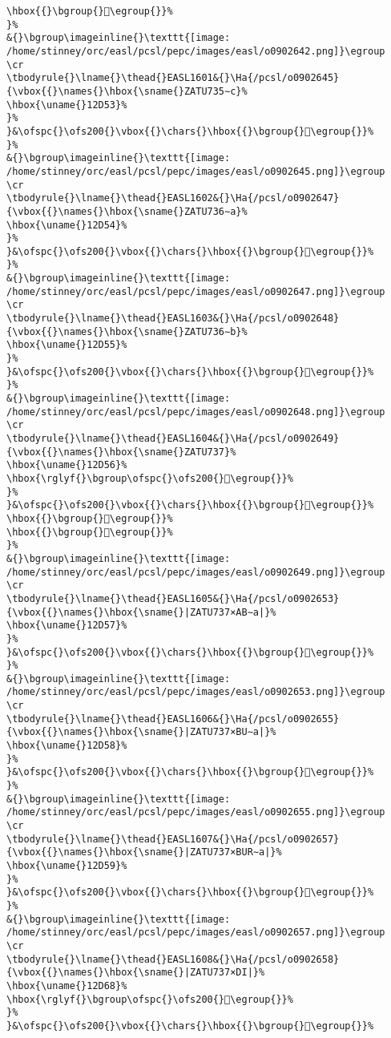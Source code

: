 \begin{verbatim}
\hbox{{}\bgroup{}𒵑\egroup{}}%
}%
&{}\bgroup\imageinline{}\texttt{[image: /home/stinney/orc/easl/pcsl/pepc/images/easl/o0902642.png]}\egroup
\cr
\tbodyrule{}\lname{}\thead{}EASL1601&{}\Ha{/pcsl/o0902645}{\vbox{{}\names{}\hbox{\sname{}ZATU735∼c}%
\hbox{\uname{}12D53}%
}%
}&\ofspc{}\ofs200{}\vbox{{}\chars{}\hbox{{}\bgroup{}𒵓\egroup{}}%
}%
&{}\bgroup\imageinline{}\texttt{[image: /home/stinney/orc/easl/pcsl/pepc/images/easl/o0902645.png]}\egroup
\cr
\tbodyrule{}\lname{}\thead{}EASL1602&{}\Ha{/pcsl/o0902647}{\vbox{{}\names{}\hbox{\sname{}ZATU736∼a}%
\hbox{\uname{}12D54}%
}%
}&\ofspc{}\ofs200{}\vbox{{}\chars{}\hbox{{}\bgroup{}𒵔\egroup{}}%
}%
&{}\bgroup\imageinline{}\texttt{[image: /home/stinney/orc/easl/pcsl/pepc/images/easl/o0902647.png]}\egroup
\cr
\tbodyrule{}\lname{}\thead{}EASL1603&{}\Ha{/pcsl/o0902648}{\vbox{{}\names{}\hbox{\sname{}ZATU736∼b}%
\hbox{\uname{}12D55}%
}%
}&\ofspc{}\ofs200{}\vbox{{}\chars{}\hbox{{}\bgroup{}𒵕\egroup{}}%
}%
&{}\bgroup\imageinline{}\texttt{[image: /home/stinney/orc/easl/pcsl/pepc/images/easl/o0902648.png]}\egroup
\cr
\tbodyrule{}\lname{}\thead{}EASL1604&{}\Ha{/pcsl/o0902649}{\vbox{{}\names{}\hbox{\sname{}ZATU737}%
\hbox{\uname{}12D56}%
\hbox{\rglyf{}\bgroup\ofspc{}\ofs200{}𒵖\egroup{}}%
}%
}&\ofspc{}\ofs200{}\vbox{{}\chars{}\hbox{{}\bgroup{}𒵖\egroup{}}%
\hbox{{}\bgroup{}𒵤\egroup{}}%
\hbox{{}\bgroup{}𒵧\egroup{}}%
}%
&{}\bgroup\imageinline{}\texttt{[image: /home/stinney/orc/easl/pcsl/pepc/images/easl/o0902649.png]}\egroup
\cr
\tbodyrule{}\lname{}\thead{}EASL1605&{}\Ha{/pcsl/o0902653}{\vbox{{}\names{}\hbox{\sname{}|ZATU737×AB∼a|}%
\hbox{\uname{}12D57}%
}%
}&\ofspc{}\ofs200{}\vbox{{}\chars{}\hbox{{}\bgroup{}𒵗\egroup{}}%
}%
&{}\bgroup\imageinline{}\texttt{[image: /home/stinney/orc/easl/pcsl/pepc/images/easl/o0902653.png]}\egroup
\cr
\tbodyrule{}\lname{}\thead{}EASL1606&{}\Ha{/pcsl/o0902655}{\vbox{{}\names{}\hbox{\sname{}|ZATU737×BU∼a|}%
\hbox{\uname{}12D58}%
}%
}&\ofspc{}\ofs200{}\vbox{{}\chars{}\hbox{{}\bgroup{}𒵘\egroup{}}%
}%
&{}\bgroup\imageinline{}\texttt{[image: /home/stinney/orc/easl/pcsl/pepc/images/easl/o0902655.png]}\egroup
\cr
\tbodyrule{}\lname{}\thead{}EASL1607&{}\Ha{/pcsl/o0902657}{\vbox{{}\names{}\hbox{\sname{}|ZATU737×BUR∼a|}%
\hbox{\uname{}12D59}%
}%
}&\ofspc{}\ofs200{}\vbox{{}\chars{}\hbox{{}\bgroup{}𒵙\egroup{}}%
}%
&{}\bgroup\imageinline{}\texttt{[image: /home/stinney/orc/easl/pcsl/pepc/images/easl/o0902657.png]}\egroup
\cr
\tbodyrule{}\lname{}\thead{}EASL1608&{}\Ha{/pcsl/o0902658}{\vbox{{}\names{}\hbox{\sname{}|ZATU737×DI|}%
\hbox{\uname{}12D68}%
\hbox{\rglyf{}\bgroup\ofspc{}\ofs200{}𒵨\egroup{}}%
}%
}&\ofspc{}\ofs200{}\vbox{{}\chars{}\hbox{{}\bgroup{}𒵚\egroup{}}%

\end{verbatim}
